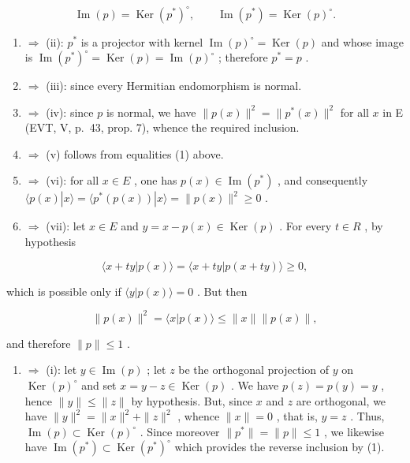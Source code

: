 \[
\operatorname{Im} (p) = \operatorname{Ker} (p ^ {*}) ^ {\circ}, \qquad \operatorname{Im} (p ^ {*}) = \operatorname{Ker} (p) ^ {\circ}.\tag{1}
\]

\begin{enumerate}
\def\labelenumi{(\roman{enumi})}
\item
  \(\Longrightarrow\) (ii): \(p^{*}\) is a projector with kernel \(\operatorname{Im}(p)^{\circ} = \operatorname{Ker}(p)\) and whose image is \(\operatorname{Im}(p^{*})^{\circ} = \operatorname{Ker}(p) = \operatorname{Im}(p)^{\circ}\) ; therefore \(p^{*} = p\) .
\item
  \(\Longrightarrow\) (iii): since every Hermitian endomorphism is normal.
\item
  \(\Longrightarrow\) (iv): since \(p\) is normal, we have \(\| p(x)\|^2 = \| p^*(x)\|^2\) for all \(x\) in E (EVT, V, p.~43, prop. 7), whence the required inclusion.
\item
  \(\Longrightarrow\) (v) follows from equalities (1) above.
\item
  \(\Longrightarrow\) (vi): for all \(x \in E\) , one has \(p(x) \in \operatorname{Im}(p^{*})\) , and consequently \(\langle p(x)|x\rangle = \langle p^{*}(p(x))|x\rangle = \|p(x)\|^{2} \geqslant 0\) .
\item
  \(\Longrightarrow\) (vii): let \(x \in E\) and \(y = x - p(x) \in \operatorname{Ker}(p)\) . For every \(t \in R\) , by hypothesis
\end{enumerate}

\[
\langle x + t y | p (x) \rangle = \langle x + t y | p (x + t y) \rangle \geqslant 0,
\]

which is possible only if \(\langle y|p(x)\rangle = 0\) . But then

\[
\| p (x) \| ^ {2} = \langle x | p (x) \rangle \leqslant \| x \| \| p (x) \|,
\]

and therefore \(\|p\|\leqslant1\) .

\begin{enumerate}
\def\labelenumi{(\roman{enumi})}
\setcounter{enumi}{6}
\tightlist
\item
  \(\Longrightarrow\) (i): let \(y \in \operatorname{Im}(p)\) ; let \(z\) be the orthogonal projection of \(y\) on \(\operatorname{Ker}(p)^{\circ}\) and set \(x = y - z \in \operatorname{Ker}(p)\) . We have \(p(z) = p(y) = y\) , hence \(\|y\| \leqslant \|z\|\) by hypothesis. But, since \(x\) and \(z\) are orthogonal, we have \(\|y\|^2 = \|x\|^2 + \|z\|^2\) , whence \(\|x\| = 0\) , that is, \(y = z\) . Thus, \(\operatorname{Im}(p) \subset \operatorname{Ker}(p)^{\circ}\) . Since moreover \(\|p^*\| = \|p\| \leqslant 1\) , we likewise have \(\operatorname{Im}(p^*) \subset \operatorname{Ker}(p^*)^{\circ}\) which provides the reverse inclusion by (1).
\end{enumerate}

